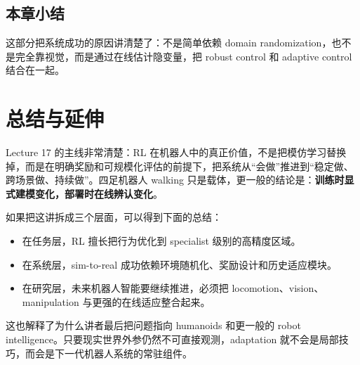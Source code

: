 \documentclass[a4paper]{article}
\begin{document}
\subsection{本章小结}

这部分把系统成功的原因讲清楚了：不是简单依赖 domain randomization，也不是完全靠视觉，而是通过在线估计隐变量，把 robust control 和 adaptive control 结合在一起。

\section{总结与延伸}

Lecture 17 的主线非常清楚：RL 在机器人中的真正价值，不是把模仿学习替换掉，而是在明确奖励和可规模化评估的前提下，把系统从“会做”推进到“稳定做、跨场景做、持续做”。四足机器人 walking 只是载体，更一般的结论是：\textbf{训练时显式建模变化，部署时在线辨认变化}。

如果把这讲拆成三个层面，可以得到下面的总结：
\begin{itemize}
\item 在任务层，RL 擅长把行为优化到 specialist 级别的高精度区域。
\item 在系统层，sim-to-real 成功依赖环境随机化、奖励设计和历史适应模块。
\item 在研究层，未来机器人智能要继续推进，必须把 locomotion、vision、manipulation 与更强的在线适应整合起来。
\end{itemize}

这也解释了为什么讲者最后把问题指向 humanoids 和更一般的 robot intelligence。只要现实世界外参仍然不可直接观测，adaptation 就不会是局部技巧，而会是下一代机器人系统的常驻组件。
\end{document}

